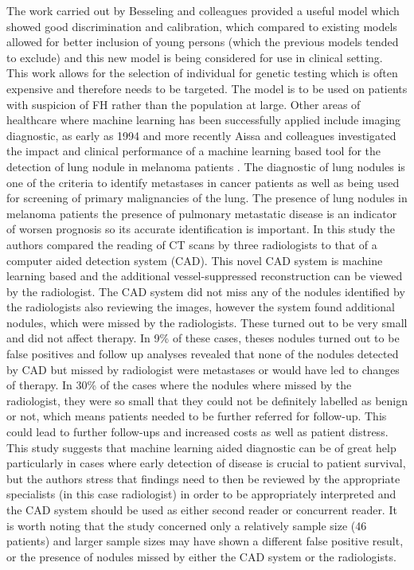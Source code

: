  The work carried out by Besseling and colleagues provided a useful model which showed good discrimination and calibration, which compared to existing models allowed for better inclusion of young persons (which the previous models tended to exclude) and this new model is being considered for use in clinical setting. This work allows for the selection of individual for genetic testing which is often expensive and therefore needs to be targeted. The model is to be used on patients with suspicion of FH rather than the population at large.\newline
 Other areas of healthcare where machine learning has been successfully applied include imaging diagnostic, as early as 1994 \citep{OLMangasarian:1994ue} and more recently Aissa and colleagues investigated the impact and clinical performance of a machine learning based tool for the detection of lung nodule in melanoma patients \citep{Aissa:2018jm}. \newline
 The diagnostic of lung nodules is one of the criteria to identify metastases in cancer patients as well as being used for screening of primary malignancies of the lung. The presence of lung nodules in melanoma patients the presence of pulmonary metastatic disease is an indicator of worsen prognosis so its accurate identification is important. In this study the authors compared the reading of CT scans by three radiologists to that of a computer aided detection system (CAD). This novel CAD system is machine learning based and the additional vessel-suppressed reconstruction can be viewed by the radiologist. \newline
 The CAD system did not miss any of the nodules identified by the radiologists also reviewing the images, however the system found additional nodules, which were missed by the radiologists. These turned out to be very small and did not affect therapy. In 9\% of these cases, theses nodules turned out to be false positives and follow up analyses revealed that none of the nodules detected by CAD but missed by radiologist were metastases or would have led to changes of therapy. In 30\% of the cases where the nodules where missed by the radiologist, they were so small that they could not be definitely labelled as benign or not, which means patients needed to be further referred for follow-up. This could lead to further follow-ups and increased costs as well as patient distress. This study suggests that machine learning aided diagnostic can be of great help particularly in cases where early detection of disease is crucial to patient survival, but the authors stress that findings need to then be reviewed by the appropriate specialists (in this case radiologist) in order to be appropriately interpreted and the CAD system should be used as either second reader or concurrent reader. It is worth noting that the study concerned only a relatively sample size (46 patients) and larger sample sizes may have shown a different false positive result, or the presence of nodules missed by either the CAD system or the radiologists.\newline
